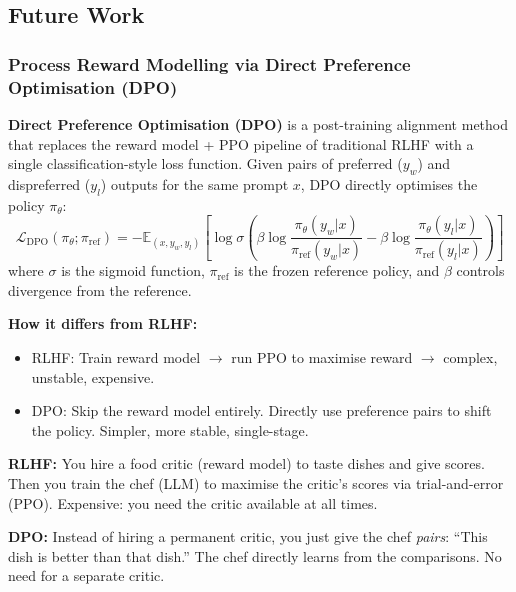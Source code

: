 \subsection{Future Work}

\subsubsection{Process Reward Modelling via Direct Preference Optimisation (DPO)}

\begin{acadbox}[\textcolor{white}{Academic Definition}]
\textbf{Direct Preference Optimisation (DPO)} is a post-training alignment method that replaces the reward model + PPO pipeline of traditional RLHF with a single classification-style loss function. Given pairs of preferred ($y_w$) and dispreferred ($y_l$) outputs for the same prompt $x$, DPO directly optimises the policy $\pi_\theta$:
\[
\mathcal{L}_{\text{DPO}}(\pi_\theta; \pi_{\text{ref}}) = -\mathbb{E}_{(x, y_w, y_l)} \left[ \log \sigma \left( \beta \log \frac{\pi_\theta(y_w | x)}{\pi_{\text{ref}}(y_w | x)} - \beta \log \frac{\pi_\theta(y_l | x)}{\pi_{\text{ref}}(y_l | x)} \right) \right]
\]
where $\sigma$ is the sigmoid function, $\pi_{\text{ref}}$ is the frozen reference policy, and $\beta$ controls divergence from the reference.

\textbf{How it differs from RLHF:}
\begin{itemize}
    \item RLHF: Train reward model $\rightarrow$ run PPO to maximise reward $\rightarrow$ complex, unstable, expensive.
    \item DPO: Skip the reward model entirely. Directly use preference pairs to shift the policy. Simpler, more stable, single-stage.
\end{itemize}
\end{acadbox}

\begin{analogybox}[\textcolor{white}{Simple Analogy}]
\textbf{RLHF:} You hire a food critic (reward model) to taste dishes and give scores. Then you train the chef (LLM) to maximise the critic's scores via trial-and-error (PPO). Expensive: you need the critic available at all times.

\textbf{DPO:} Instead of hiring a permanent critic, you just give the chef \textit{pairs}: ``This dish is better than that dish.'' The chef directly learns from the comparisons. No need for a separate critic.
\end{analogybox}

